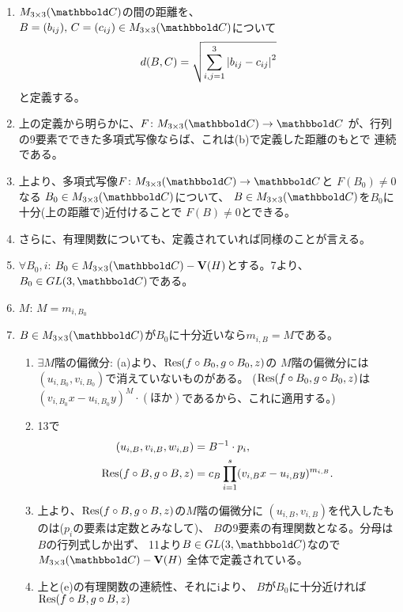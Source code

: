 \begin{myproof}
\begin{enumerate}
\begin{enumerate}
      \item
      $M_{3\times 3}(\C)$の間の距離を、
      $B=(b_{ij}),\, C=(c_{ij}) \in M_{3\times 3}(\C)$について
      \begin{align}
        d(B,C)
        =
        \sqrt{\sum_{i,j=1}^3 \left|b_{ij}-c_{ij}\right|^2}
      \end{align}
      と定義する。
      \item
      上の定義から明らかに、$F\colon M_{3\times 3}(\C) \to \C$
      が、行列の9要素でできた多項式写像ならば、これは(b)で定義した距離のもとで
      連続である。
      \item
      上より、多項式写像$F\colon M_{3\times 3}(\C) \to \C$と
      $F(B_0) \neq 0$なる
      $B_0 \in M_{3\times 3}(\C)$について、
      $B \in M_{3\times 3}(\C)$を$B_0$に十分(上の距離で)近付けることで
      $F(B) \neq 0$とできる。
      \item
      さらに、有理関数についても、定義されていれば同様のことが言える。
      \item $\forall B_0,i$: $B_0 \in M_{3\times 3}(\C) - \var(H)$とする。7より、$B_0 \in GL(3,\C)$である。
      \item $M$: $M=m_{i,B_0}$
      \item $B \in M_{3\times 3}(\C)$が$B_0$に十分近いなら$m_{i,B} =  M$である。
      \begin{enumerate}
        \item $\exists M階の偏微分$: (a)より、$\mathrm{Res}(f\circ B_0, g\circ B_0,z)$の
        $M$階の偏微分には$(u_{i,B_0},v_{i,B_0})$で消えていないものがある。
        ($\mathrm{Res}(f\circ B_0, g\circ B_0,z)$は$(v_{i,B_0}x-u_{i,B_0}y)^{M}\cdot (ほか)$であるから、これに適用する。)
        \item
        13で
        \begin{align}
          (u_{i,B},v_{i,B},w_{i,B}) &=
          B^{-1} \cdot p_i,\\
          \mathrm{Res}(f\circ B, g\circ B,z)
          &=
          c_B \prod_{i=1}^s (v_{i,B}x-u_{i,B}y)^{m_{i,B}}.
        \end{align}
        \item
        上より、$\mathrm{Res}(f\circ B, g\circ B, z)$の$M$階の偏微分に
        $(u_{i,B},v_{i,B})$を代入したものは($p_i$の要素は定数とみなして)、
        $B$の9要素の有理関数となる。分母は$B$の行列式しか出ず、
        11より$B\in GL(3,\C)$なので$M_{3\times 3}(\C) - \var(H)$
        全体で定義されている。
        \item
        上と(e)の有理関数の連続性、それにiより、
        $B$が$B_0$に十分近ければ$\mathrm{Res}(f\circ B,g\circ B,z)$

\end{enumerate}
\end{enumerate}
\end{enumerate}
\end{myproof}

